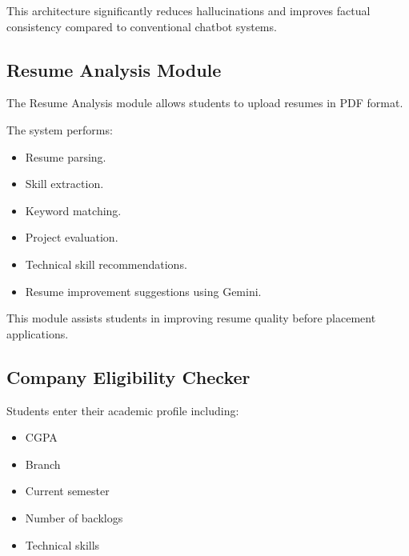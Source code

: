 \documentclass[11pt]{article}
\begin{document}
This architecture significantly reduces hallucinations and improves factual consistency compared to conventional chatbot systems.

\subsection{Resume Analysis Module}

The Resume Analysis module allows students to upload resumes in PDF format.

The system performs:

\begin{itemize}

\item Resume parsing.

\item Skill extraction.

\item Keyword matching.

\item Project evaluation.

\item Technical skill recommendations.

\item Resume improvement suggestions using Gemini.

\end{itemize}

This module assists students in improving resume quality before placement applications.

\subsection{Company Eligibility Checker}

Students enter their academic profile including:

\begin{itemize}

\item CGPA

\item Branch

\item Current semester

\item Number of backlogs

\item Technical skills

\end{itemize}
\end{document}

